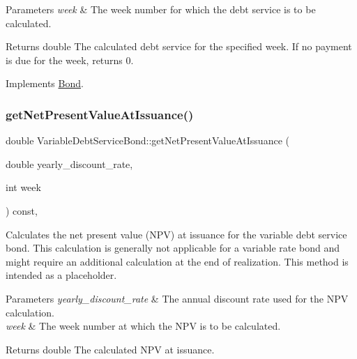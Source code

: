 \begin{DoxyParams}{Parameters}
{\em week} & The week number for which the debt service is to be calculated.\\
\hline
\end{DoxyParams}
\begin{DoxyReturn}{Returns}
double The calculated debt service for the specified week. If no payment is due for the week, returns 0. 
\end{DoxyReturn}


Implements \mbox{\hyperlink{classBond_a98d8ecaf4b36319674ebd220598996bc}{Bond}}.

\mbox{\label{classVariableDebtServiceBond_a8cc7ee442d788b91b8c00e6bed07644d}} 
\subsubsection{\texorpdfstring{get\+Net\+Present\+Value\+At\+Issuance()}{getNetPresentValueAtIssuance()}}
{\footnotesize\ttfamily double Variable\+Debt\+Service\+Bond\+::get\+Net\+Present\+Value\+At\+Issuance (\begin{DoxyParamCaption}\item[{double}]{yearly\+\_\+discount\+\_\+rate,  }\item[{int}]{week }\end{DoxyParamCaption}) const\hspace{0.3cm}{\ttfamily [override]}, {\ttfamily [virtual]}}



Calculates the net present value (N\+PV) at issuance for the variable debt service bond. This calculation is generally not applicable for a variable rate bond and might require an additional calculation at the end of realization. This method is intended as a placeholder. 


\begin{DoxyParams}{Parameters}
{\em yearly\+\_\+discount\+\_\+rate} & The annual discount rate used for the N\+PV calculation. \\
\hline
{\em week} & The week number at which the N\+PV is to be calculated.\\
\hline
\end{DoxyParams}
\begin{DoxyReturn}{Returns}
double The calculated N\+PV at issuance. 
\end{DoxyReturn}


